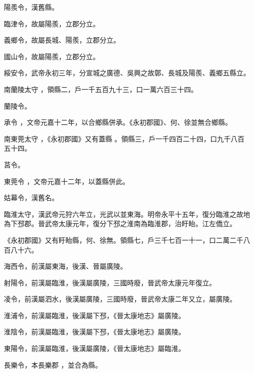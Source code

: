 \begin{pinyinscope}
 陽羨令，漢舊縣。



 臨津令，故屬陽羨，立郡分立。



 義鄉令，故屬長城、陽羨，立郡分立。



 國山令，故屬陽羨，立郡分立。



 綏安令，武帝永初三年，分宣城之廣德、吳興之故鄣、長城及陽羨、義鄉五縣立。


南蘭陵太守
 ，領縣二，戶一千五百九十三，口一萬六百三十四。


蘭陵令。


承令
 ，文帝元嘉十二年，以合鄉縣併承。《永初郡國》、何、徐並無合鄉縣。


南東莞太守
 ，《永初郡國》又有蓋縣
 。領縣三，戶一千四百二十四，口九千八百五十四。


莒令。


東莞令
 ，文帝元嘉十二年，以蓋縣併此。



 姑幕令，漢舊名。



 臨淮太守，漢武帝元狩六年立，光武以並東海。明帝永平十五年，復分臨淮之故地為下邳郡。晉武帝太康元年，復分下邳之淮南為臨淮郡，治盱眙。江左僑立。



 《永初郡國》又有盱眙縣，何、徐無。領縣七，戶三千七百一十一，口二萬二千八百八十六。



 海西令，前漢屬東海，後漢、晉屬廣陵。



 射陽令，前漢屬臨淮，後漢屬廣陵，三國時廢，晉武帝太康元年復立。



 凌令，前漢屬泗水，後漢屬廣陵，三國時廢，晉武帝太康二年又立，屬廣陵。



 淮浦令，前漢屬臨淮，後漢屬下邳，《晉太康地志》屬廣陵。



 淮陰令，前漢屬臨淮，後漢屬下邳，《晉太康地志》屬廣陵。



 東陽令，前漢屬臨淮，後漢屬廣陵，《晉太康地志》屬臨淮。


長樂令，本長樂郡
 ，並合為縣。



\end{pinyinscope}
